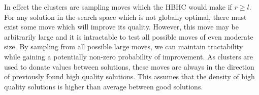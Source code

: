 \documentclass{sig-alternate}
\newcommand{\BigO}[1]{$\mathcal{O}{(#1)}$}
\begin{document}
In effect the clusters are sampling moves which the HBHC
would make if $r \ge l$. For any solution in the search space which is not globally optimal, there
must exist some move which will improve its quality. However, this move may
be arbitrarily large and it is intractable to test all possible moves of even moderate size.
By sampling from all possible large moves, we can maintain tractability while gaining
a potentially non-zero probability of improvement.
As clusters are used to donate values between solutions, these
moves are always in the direction of previously found high quality solutions.
This assumes that the density of high quality solutions is higher than average between good solutions.

\begin{comment}
Figure~\ref{fig-sfx-tree} provides an efficient method for creating a linkage
tree similar to that used in Black-Box P3 given subfunction information.
Each variable starts in its own cluster. Each subfunction in a random order
is used to determine how to link existing clusters. If a subfunction overlaps
multiple top level clusters, all overlapped clusters are merged to create a new
top level cluster. This process creates a linkage tree similar to that learned
for P3, with the difference that a node in the tree can have up to $k$ children.

\Call{SubfunctionTree}{} requires \BigO{|cluster|} time to construct each $cluster$
in the linkage tree. In the gray-box domain the total number of subfunctions is required
to be $\Theta(N)$ in order to ensure the problem is not separable. As all variables must
participate in a subfunction, $\Theta(N)$ clusters must be created. Therefore
the only cost which cannot be amortized over the clusters to \BigO{1} is the creation
of each new $cluster$, leading to a time of \BigO{|cluster|} per $cluster$.

This method of constructing clusters has a number of desirable properties beyond its
efficiency. As all non-linear relationships are denoted by subfunctions, mixing
complete subfunctions between individuals has a high likelihood of preserving quality.
Each cluster contains at least one entire subfunction, and two
clusters must differ by at least one entire subfunction. The probability two
variables appear in the same cluster increases with the number of subfunctions
they share. The more paths that exist between two variables in the subfunction
connectivity graph, the more likely those variables will appear in the same cluster.
\end{comment}
\end{document}
